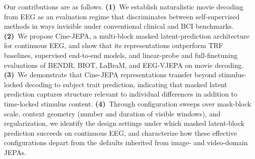 Our contributions are as follows. \textbf{(1)}~We establish naturalistic movie
decoding from EEG as an evaluation regime that discriminates between
self-supervised methods in ways invisible under conventional clinical and BCI
benchmarks. \textbf{(2)}~We propose Cine-JEPA, a multi-block masked
latent-prediction architecture for continuous EEG, and show that its
representations outperform TRF baselines, supervised end-to-end models, and
linear-probe and full-finetuning evaluations of BENDR, BIOT, LaBraM, and
EEG-VJEPA on movie decoding. \textbf{(3)}~We demonstrate that Cine-JEPA
representations transfer beyond stimulus-locked decoding to subject trait
prediction, indicating that masked latent prediction captures structure
relevant to individual differences in addition to time-locked stimulus content.
\textbf{(4)}~Through configuration sweeps over mask-block scale, context
geometry (number and duration of visible windows), and regularization, we
identify the design settings under which masked latent-block prediction
succeeds on continuous EEG, and characterize how these effective configurations
depart from the defaults inherited from image- and video-domain JEPAs.